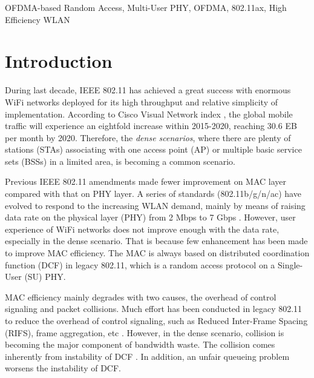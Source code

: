 \documentclass[journal]{IEEEtran}
\begin{document}
\begin{IEEEkeywords}
OFDMA-based Random Access, Multi-User PHY, OFDMA, 802.11ax, High Efficiency WLAN
\end{IEEEkeywords}






%
\IEEEpeerreviewmaketitle
\section{Introduction}		\label{Intro}
During last decade, IEEE 802.11 has achieved a great success with enormous WiFi networks deployed for its high throughput and relative simplicity of implementation.
According to Cisco Visual Network index \cite{cisco2016}, the global mobile traffic will experience an eightfold increase within 2015-2020, reaching 30.6 EB per month by 2020.
Therefore, the \textit{dense scenarios}, where there are plenty of stations (STAs) associating with one access point (AP) or multiple basic service sets (BSSs) in a limited area, is becoming a common scenario. 

Previous IEEE 802.11 amendments made fewer improvement on MAC layer compared with that on PHY layer. 
A series of standards (802.11b/g/n/ac) have evolved to respond to the increasing WLAN demand, mainly by means of raising data rate on the physical layer (PHY)  from 2 Mbps to 7 Gbps \cite{perahia2013next}.
However, user experience of WiFi networks does not improve enough with the data rate, especially in the dense scenario. 
That is because few enhancement has been made to improve MAC efficiency.
The MAC is always based on distributed coordination function (DCF) in legacy 802.11, which is a random access protocol on a Single-User (SU) PHY. 

MAC efficiency mainly degrades with two causes, the overhead of control signaling and packet collisions.
Much effort has been conducted in legacy 802.11 to reduce the overhead of control signaling, such as Reduced Inter-Frame Spacing (RIFS), frame aggregation, etc \cite{perahia2013next}. 
However, in the dense scenario, collision is becoming the major component of bandwidth waste.
The collision comes inherently from instability of DCF \cite{bertsekas1992data}.
In addition, an unfair queueing problem worsens the instability of DCF.
\end{document}
